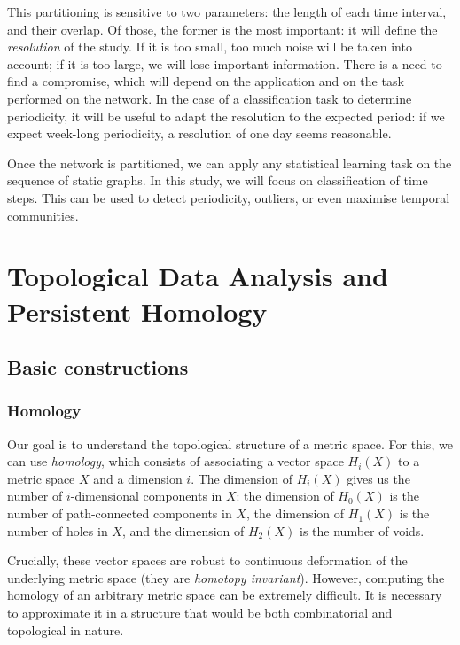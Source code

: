 \documentclass[a4paper,11pt,openany,extrafontsizes]{memoir}
\begin{document}
This partitioning is sensitive to two parameters: the length of each
time interval, and their overlap. Of those, the former is the most
important: it will define the \emph{resolution} of the study. If it is
too small, too much noise will be taken into account; if it is too
large, we will lose important information. There is a need to find a
compromise, which will depend on the application and on the task
performed on the network. In the case of a classification task to
determine periodicity, it will be useful to adapt the resolution to
the expected period: if we expect week-long periodicity, a resolution
of one day seems reasonable.

Once the network is partitioned, we can apply any statistical learning
task on the sequence of static graphs. In this study, we will focus on
classification of time steps. This can be used to detect periodicity,
outliers, or even maximise temporal communities.


\chapter{Topological Data Analysis and Persistent Homology}%
\label{cha:tda-ph}


\section{Basic constructions}%
\label{sec:basic-constructions}

\subsection{Homology}%
\label{sec:homology}

Our goal is to understand the topological structure of a metric
space. For this, we can use \emph{homology}, which consists of
associating a vector space $H_i(X)$ to a metric space $X$ and a
dimension $i$. The dimension of $H_i(X)$ gives us the number of
$i$-dimensional components in $X$: the dimension of $H_0(X)$ is the
number of path-connected components in $X$, the dimension of $H_1(X)$
is the number of holes in $X$, and the dimension of $H_2(X)$ is the
number of voids.

Crucially, these vector spaces are robust to continuous deformation of
the underlying metric space (they are \emph{homotopy
  invariant}). However, computing the homology of an arbitrary metric
space can be extremely difficult. It is necessary to approximate it in
a structure that would be both combinatorial and topological in
nature.
\end{document}
